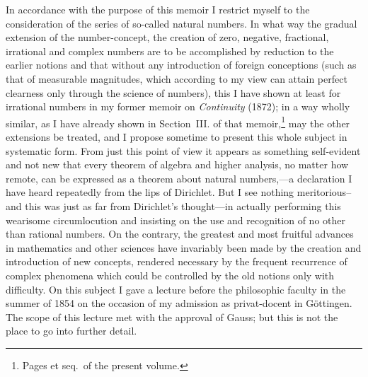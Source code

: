 \documentclass[oneside]{book}
\begin{document}
In accordance with the purpose of this memoir I
restrict myself to the consideration of the series of
so-called natural numbers. In what way the gradual
extension of the number-concept, the creation of
zero, negative, fractional, irrational and complex
numbers are to be accomplished by reduction to the
earlier notions and that without any introduction of
foreign conceptions (such as that of measurable magnitudes,
which according to my view can attain perfect
clearness only through the science of numbers),
this I have shown at least for irrational numbers
in my former memoir on \textit{Continuity} (1872); in a way
wholly similar, as I have already shown in Section~III.
of that memoir,\footnote{Pages \pageref{EISIII} et seq.\ of the present volume.}
may the other extensions be treated,
and I propose sometime to present this whole subject
in systematic form. From just this point of view it
appears as something self-evident and not new that
every theorem of algebra and higher analysis, no matter
how remote, can be expressed as a theorem about
natural numbers,---a declaration I have heard repeatedly
from the lips of Dirichlet. But I see nothing
meritorious--and this was just as far from Dirichlet's
thought---in actually performing this wearisome circumlocution
and insisting on the use and recognition
of no other than rational numbers. On the contrary,
the greatest and most fruitful advances in mathematics
and other sciences have invariably been made by the
creation and introduction of new concepts, rendered
necessary by the frequent recurrence of complex phenomena
which could be controlled by the old notions
only with difficulty. On this subject I gave a lecture
before the philosophic faculty in the summer of 1854
on the occasion of my admission as privat-docent in
Göttingen. The scope of this lecture met with the
approval of Gauss; but this is not the place to go
into further detail.
\end{document}
